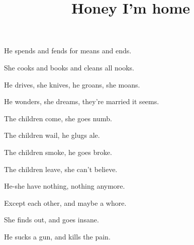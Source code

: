 \documentclass{article}
\title{Honey I'm home}
\begin{document}
 \newline

He spends and fends for means and ends.

She cooks and books and cleans all nooks.

He drives, she knives, he groans, she moans.

He wonders, she dreams, they're married it seems.

\newline
\newline

The children come, she goes numb.

The children wail, he glugs ale.

The children smoke, he goes broke.

The children leave, she can't believe.

\newline
\newline

He-she have nothing, nothing anymore.

Except each other, and maybe a whore.

She finds out, and goes insane.

He sucks a gun, and kills the pain.
\end{document}
